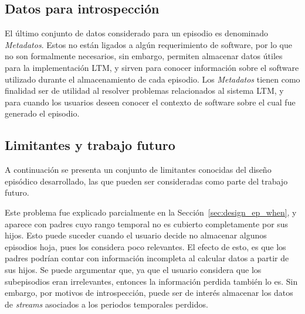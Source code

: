 \subsection{Datos para introspección}

El último conjunto de datos considerado para un episodio es denominado \textit{Metadatos}. Estos no están ligados a algún requerimiento de software, por lo que no son formalmente necesarios, sin embargo, permiten almacenar datos útiles para la implementación LTM, y sirven para conocer información sobre el software utilizado durante el almacenamiento de cada episodio. Los \textit{Metadatos} tienen como finalidad ser de utilidad al resolver problemas relacionados al sistema LTM, y para cuando los usuarios deseen conocer el contexto de software sobre el cual fue generado el episodio.


\subsection{Limitantes y trabajo futuro}

A continuación se presenta un conjunto de limitantes conocidas del diseño episódico desarrollado, las que pueden ser consideradas como parte del trabajo futuro.

Este problema fue explicado parcialmente en la Sección~\ref{sec:design_ep_when}, y aparece con padres cuyo rango temporal no es cubierto completamente por sus hijos. Esto puede suceder cuando el usuario decide no almacenar algunos episodios hoja, pues los considera poco relevantes. El efecto de esto, es que los padres podrían contar con información incompleta al calcular datos a partir de sus hijos. Se puede argumentar que, ya que el usuario considera que los subepisodios eran irrelevantes, entonces la información perdida también lo es. Sin embargo, por motivos de introspección, puede ser de interés almacenar los datos de \textit{streams} asociados a los periodos temporales perdidos.


